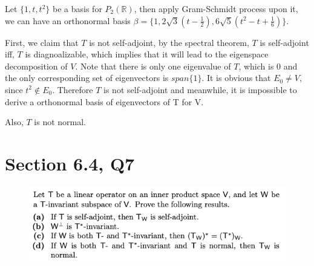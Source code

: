 \documentclass[12pt]{article}%
\begin{document}
Let $\{1,t,t^2\}$ be a basis for $P_2(\mathbb{R})$, then apply Gram-Schmidt process upon it, 
we can have an orthonormal basis $\beta=\{1,2\sqrt{3}(t-\frac{1}{2}),6\sqrt{5}(t^2-t+\frac{1}{6})\}.$

First, we claim that $T$ is not self-adjoint, by the spectral theorem, $T$ is 
self-adjoint iff, $T$ is diagnoalizable, which implies that it will lead to the 
eigenspace decomposition of $V$. Note that there is only one eigenvalue of $T$, 
which is 0 and the only corresponding set 
of eigenvectors is $span\{1\}$. It is obvious that $E_0 \neq V,$ 
since $t^2 \notin E_0.$ Therefore $T$ is not self-adjoint and meanwhile, 
it is impossible to derive a orthonormal basis of eigenvectors of T for V.

Also, $T$ is not normal.


\newpage

\section{Section 6.4, Q7}
\begin{figure}[htp]
    \centering %
    \includegraphics[width = 16cm]{img/Q6.png}
\end{figure}
\end{document}
